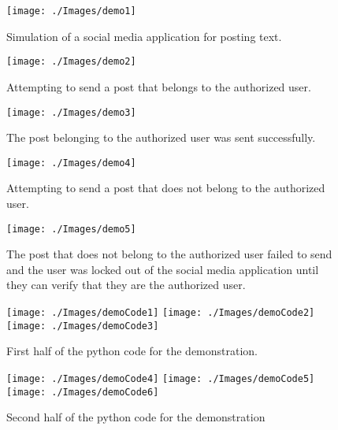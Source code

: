 \documentclass[11pt]{article}
\begin{document}




\begin{figure}[h]
\texttt{[image: ./Images/demo1]}
  \caption{Simulation of a social media application for posting text.}
  \label{demo1}
\end{figure}

\begin{figure}[h]
\texttt{[image: ./Images/demo2]}
  \caption{Attempting to send a post that belongs to the authorized user.}
  \label{demo2}
\end{figure}

\begin{figure}[h]
\texttt{[image: ./Images/demo3]}
  \caption{The post belonging to the authorized user was sent successfully.}
  \label{demo3}
\end{figure}

\begin{figure}[h]
\texttt{[image: ./Images/demo4]}
  \caption{Attempting to send a post that does not belong to the authorized user.}
  \label{demo4}
\end{figure}

\begin{figure}[h]
\texttt{[image: ./Images/demo5]}
  \caption{The post that does not belong to the authorized user failed to send and the user was locked out of the social media application until they can verify that they are the authorized user.}
  \label{demo5}
\end{figure}



\begin{figure}
\texttt{[image: ./Images/demoCode1]}
\texttt{[image: ./Images/demoCode2]}
\texttt{[image: ./Images/demoCode3]}
  \caption{First half of the python code for the demonstration.}
  \label{demoCode1}
\end{figure}

\begin{figure}

\texttt{[image: ./Images/demoCode4]}
\texttt{[image: ./Images/demoCode5]}
\texttt{[image: ./Images/demoCode6]}
  \caption{Second half of the python code for the demonstration}
  \label{demoCode2}
\end{figure}
\end{document}
